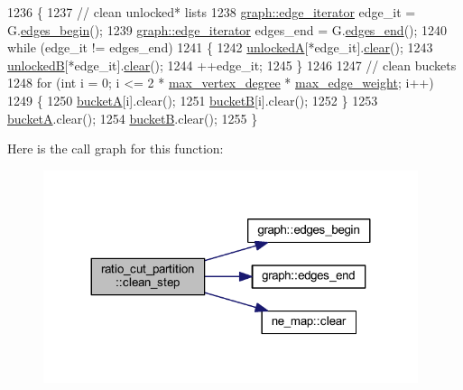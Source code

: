 \begin{DoxyCode}
1236 \{
1237     \textcolor{comment}{// clean unlocked* lists}
1238     \mbox{\hyperlink{classgraph_a818d3766018eb0af91d520ce2150203c}{graph::edge\_iterator}} edge\_it = G.\mbox{\hyperlink{classgraph_a7ba35a4c4e8343ffb27ed6d9703c6f18}{edges\_begin}}();
1239     \mbox{\hyperlink{classgraph_a818d3766018eb0af91d520ce2150203c}{graph::edge\_iterator}} edges\_end = G.\mbox{\hyperlink{classgraph_aea8d7f976b85b6137f52d915e26639f6}{edges\_end}}();
1240     \textcolor{keywordflow}{while} (edge\_it != edges\_end)
1241     \{
1242     \mbox{\hyperlink{classratio__cut__partition_a9e4d0ba86475bd0faa98e01c6be4dde0}{unlockedA}}[*edge\_it].\mbox{\hyperlink{classne__map_aebe555c23769c6dcc869b5ac7fae6a9c}{clear}}();
1243     \mbox{\hyperlink{classratio__cut__partition_af7c877d8c6e9b533ab34cde1c6690b25}{unlockedB}}[*edge\_it].\mbox{\hyperlink{classne__map_aebe555c23769c6dcc869b5ac7fae6a9c}{clear}}();
1244     ++edge\_it;
1245     \}
1246     
1247     \textcolor{comment}{// clean buckets}
1248     \textcolor{keywordflow}{for} (\textcolor{keywordtype}{int} i = 0; i <= 2 * \mbox{\hyperlink{classratio__cut__partition_ab07041983ab24ac059e8c98192c146e4}{max\_vertex\_degree}} * 
      \mbox{\hyperlink{classratio__cut__partition_a74193c82e8dc7d997780613378919106}{max\_edge\_weight}}; i++)
1249     \{
1250     \mbox{\hyperlink{classratio__cut__partition_ac9c2f4f99e1042d69f44c1a1f79d4a2f}{bucketA}}[i].clear();
1251     \mbox{\hyperlink{classratio__cut__partition_a68f6fa1360b848a0a046e1adf3827f05}{bucketB}}[i].clear();
1252     \}
1253     \mbox{\hyperlink{classratio__cut__partition_ac9c2f4f99e1042d69f44c1a1f79d4a2f}{bucketA}}.clear();
1254     \mbox{\hyperlink{classratio__cut__partition_a68f6fa1360b848a0a046e1adf3827f05}{bucketB}}.clear();
1255 \}
\end{DoxyCode}
Here is the call graph for this function\+:\nopagebreak
\begin{figure}[H]
\begin{center}
\leavevmode
\includegraphics[width=311pt]{classratio__cut__partition_aa8e1c0cce3f126e1aa4a3aa8489986fa_cgraph}
\end{center}
\end{figure}
